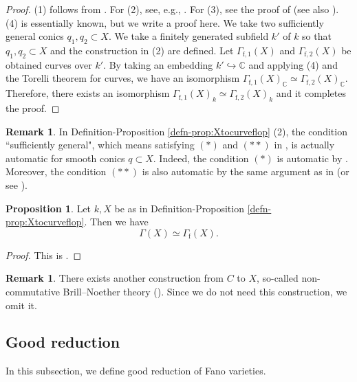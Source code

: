\documentclass[autodetect-engine, a4paper]{amsart}
\theoremstyle{definition}
\newtheorem{prop}[thm]{Proposition}
\newtheorem{rem}[thm]{Remark}
\def\C{{\mathbb C}}
\begin{document}
\begin{proof}
(1) follows from \cite[Corollary 4.1.13]{Iskovskikh-Prokhorov}.
For (2), see, e.g.,  \cite[Theorem 6.3 and Theorem 6.5]{Iliev-Markushevich}.
For (3), see the proof of \cite[Lemma 6.8]{Iliev-Markushevich}
(see also \cite[Section 8]{MukaiBrill}).
(4) is essentially known, but we write a proof here.
We take two sufficiently general conics $q_1, q_2 \subset X$. 
We take a finitely generated subfield $k'$ of $k$ so that $q_1, q_2 \subset X$ and the construction in (2) are defined. 
Let $\Gamma_{\mathrm{f}, 1} (X)$ and $\Gamma_{\mathrm{f}, 2} (X)$ be obtained curves over $k'$.
By taking an embedding $k' \hookrightarrow \C$ and applying (4) and the Torelli theorem for curves, we have an isomorphism $\Gamma_{\mathrm{f},1} (X)_{\C} \simeq \Gamma_{\mathrm{f},2} (X)_{\C}$.
Therefore, there exists an isomorphism $\Gamma_{\mathrm{f},1} (X)_{k} \simeq \Gamma_{\mathrm{f},2} (X)_{k}$ and it completes the proof.
\end{proof}

\begin{rem}
\label{rem:suffgeneral}
In Definition-Proposition \ref{defn-prop:Xtocurveflop} (2), the condition ``sufficiently general", which means satisfying $(\ast)$ and $(\ast\ast)$ in \cite[Subsection 4.1]{Iskovskikh-Prokhorov}, is actually automatic for smooth conics $q \subset X$.
Indeed, the condition $(\ast)$ is automatic by \cite[Corollary 4.4.3]{Iskovskikh-Prokhorov}.
Moreover, the condition $(\ast \ast)$ is also automatic by the same argument as in \cite[Proposition 4.2, and Proposition 7.3]{Tanaka2} (or see \cite{Jahnke-Peternell-Radloff}).
\end{rem}


\begin{prop}
\label{prop:relationGamma}
Let $k, X$ be as in Definition-Proposition \ref{defn-prop:Xtocurveflop}.
Then we have 
\[
\Gamma (X) \simeq \Gamma_{\mathrm{f}}(X).
\]
\end{prop}

\begin{proof}
This is \cite[Corollary 6.12]{Iliev-Markushevich}.
\end{proof}

\begin{rem}
There exists another construction from $C$ to $X$, so-called non-commutative Brill--Noether theory (\cite{MukaiBrill}).
Since we do not need this construction, we omit it.
\end{rem}


\subsection{Good reduction}
In this subsection, we define good reduction of Fano varieties.
\end{document}
